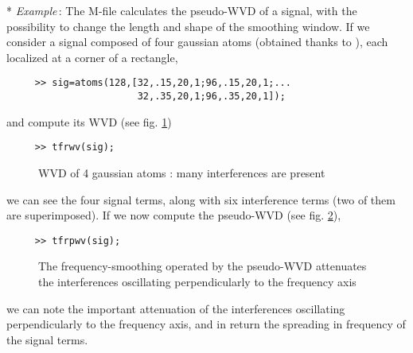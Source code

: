   * {\it Example}\,: The M-file  calculates the pseudo-WVD of a signal, with the possibility to
change the length and shape of the smoothing window. If we consider a
signal composed of four gaussian atoms (obtained thanks to ), each localized at a corner of a rectangle,
\begin{verbatim}
     >> sig=atoms(128,[32,.15,20,1;96,.15,20,1;...
                       32,.35,20,1;96,.35,20,1]);
\end{verbatim}
and compute its WVD (see fig. \ref{En1fig4})
\begin{verbatim}
     >> tfrwv(sig);
\end{verbatim}
\begin{figure}[htb]
\epsfxsize=10cm
\epsfysize=8cm
\centerline{}
\caption{\label{En1fig4}WVD of 4 gaussian atoms : many interferences are
present} 
\end{figure}
we can see the four signal terms, along with six interference terms (two of
them are superimposed). If we now compute the pseudo-WVD (see
fig. \ref{En1fig5}),
\begin{verbatim}
     >> tfrpwv(sig);
\end{verbatim}
\begin{figure}[htb]
\epsfxsize=10cm
\epsfysize=8cm
\centerline{}
\caption{\label{En1fig5}The frequency-smoothing operated by the pseudo-WVD
attenuates the interferences oscillating perpendicularly to the frequency
axis}
\end{figure}
we can note the important attenuation of the interferences oscillating
perpendicularly to the frequency axis, and in return the spreading in
frequency of the signal terms.

